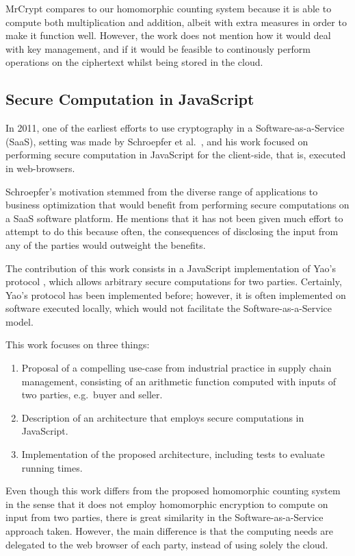 MrCrypt compares to our homomorphic counting system because it is able to compute both multiplication and addition, albeit with extra measures in order to make it function well. However, the work does not mention how it would deal with key management, and if it would be feasible to continously perform operations on the ciphertext whilst being stored in the cloud.

\subsection{Secure Computation in JavaScript}

In 2011, one of the earliest efforts to use cryptography in a Software-as-a-Service (SaaS), setting was made by Schroepfer et al.\ \cite{Schroepfer:2011:DSC:2046707.2093509}, and his work focused on performing secure computation in JavaScript for the client-side, that is, executed in web-browsers.

Schroepfer's motivation stemmed from the diverse range of applications to business optimization that would benefit from performing secure computations on a SaaS software platform. He mentions that it has not been given much effort to attempt to do this because often, the consequences of disclosing the input from any of the parties would outweight the benefits.

The contribution of this work consists in a JavaScript implementation of Yao's protocol \cite{Yao:1986:GES:1382439.1382944}, which allows arbitrary secure computations for two parties. Certainly, Yao's protocol has been implemented before; however, it is often implemented on software executed locally, which would not facilitate the Software-as-a-Service model.

This work focuses on three things:
\begin{enumerate}
\item Proposal of a compelling use-case from industrial practice in supply chain management, consisting of an arithmetic function computed with inputs of two parties, e.g.\ buyer and seller.
\item Description of an architecture that employs secure computations in JavaScript.
\item Implementation of the proposed architecture, including tests to evaluate running times.
\end{enumerate}
   
Even though this work differs from the proposed homomorphic counting system in the sense that it does not employ homomorphic encryption to compute on input from two parties, there is great similarity in the Software-as-a-Service approach taken. However, the main difference is that the computing needs are delegated to the web browser of each party, instead of using solely the cloud.

